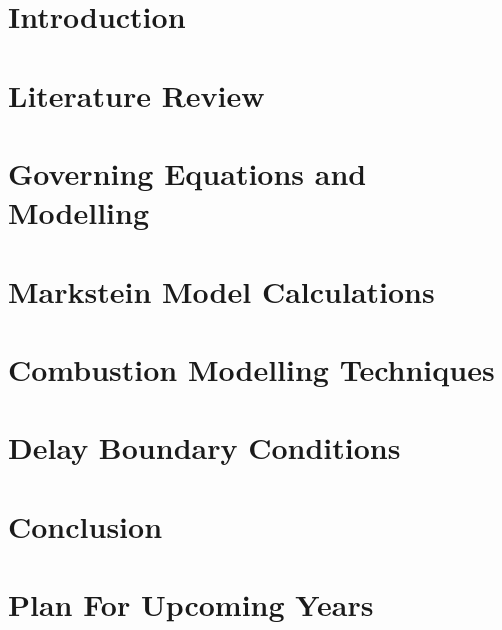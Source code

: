 \documentclass[lmr,second,hyperref,rgb,hyperref,dvipsnames]{uom_thesis_casson}
\title{\xmp@Title}
\author{\xmp@Author}
\begin{document}
\maketitle



\uomtoc

\uomstartmainbody %

\chapter{Introduction} \label{ch:intro}


\chapter{Literature Review} \label{ch:lit-review}


\chapter{Governing Equations and Modelling} \label{ch:govern-eqns}


\chapter{Markstein Model Calculations} \label{ch:markstein}


\chapter{Combustion Modelling Techniques} \label{ch:techniques}


\chapter{Delay Boundary Conditions} \label{ch:delay-bcs}


\chapter{Conclusion} \label{ch:conc}


\chapter{Plan For Upcoming Years} \label{ch:plan}



\printbibliography[title={References},heading=bibintoc]
\end{document}
